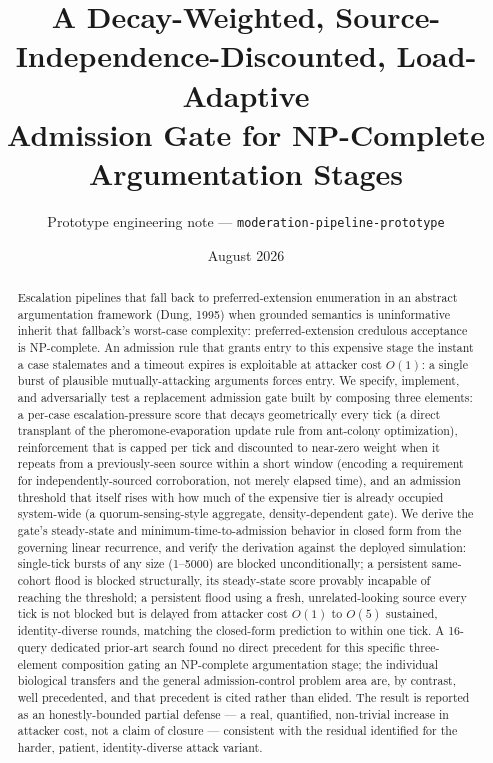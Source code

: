 \documentclass[11pt]{article}
\title{A Decay-Weighted, Source-Independence-Discounted, Load-Adaptive\\
Admission Gate for NP-Complete Argumentation Stages}
\author{Prototype engineering note --- \texttt{moderation-pipeline-prototype}}
\date{August 2026}
\begin{document}
\maketitle

\begin{abstract}
Escalation pipelines that fall back to preferred-extension enumeration in an abstract
argumentation framework (Dung, 1995) when grounded semantics is uninformative inherit
that fallback's worst-case complexity: preferred-extension credulous acceptance is
NP-complete. An admission rule that grants entry to this expensive stage the instant a
case stalemates and a timeout expires is exploitable at attacker cost $O(1)$: a single
burst of plausible mutually-attacking arguments forces entry. We specify, implement, and
adversarially test a replacement admission gate built by composing three elements: a
per-case escalation-pressure score that decays geometrically every tick (a direct
transplant of the pheromone-evaporation update rule from ant-colony optimization),
reinforcement that is capped per tick and discounted to near-zero weight when it repeats
from a previously-seen source within a short window (encoding a requirement for
independently-sourced corroboration, not merely elapsed time), and an admission
threshold that itself rises with how much of the expensive tier is already occupied
system-wide (a quorum-sensing-style aggregate, density-dependent gate). We derive the
gate's steady-state and minimum-time-to-admission behavior in closed form from the
governing linear recurrence, and verify the derivation against the deployed simulation:
single-tick bursts of any size (1--5000) are blocked unconditionally; a persistent
same-cohort flood is blocked structurally, its steady-state score provably incapable of
reaching the threshold; a persistent flood using a fresh, unrelated-looking source every
tick is not blocked but is delayed from attacker cost $O(1)$ to $O(5)$ sustained,
identity-diverse rounds, matching the closed-form prediction to within one tick. A
16-query dedicated prior-art search found no direct precedent for this specific
three-element composition gating an NP-complete argumentation stage; the individual
biological transfers and the general admission-control problem area are, by contrast,
well precedented, and that precedent is cited rather than elided. The result is reported
as an honestly-bounded partial defense --- a real, quantified, non-trivial increase in
attacker cost, not a claim of closure --- consistent with the residual identified for the
harder, patient, identity-diverse attack variant.
\end{abstract}
\end{document}
